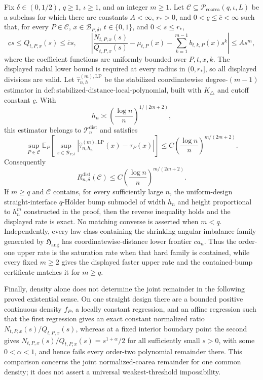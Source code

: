 Fix \(\delta\in(0,1/2)\), \(q\geq1\), \(\iota\geq1\), and an integer \(m\geq1\).  Let \(\mathcal C\subseteq\mathcal P_{\mathrm{coarea}}(q,\iota,L)\) be a subclass for which there are constants \(A<\infty\), \(r_*>0\), and \(0<\underline c\leq\overline c<\infty\) such that, for every \(P\in\mathcal C\), \(x\in\mathcal B_{P,\delta}\), \(t\in\{0,1\}\), and \(0<s\leq r_*\),
\[
 \underline c s\leq Q_{t,P,x}(s)\leq\overline c s,
 \qquad
 \left|\frac{N_{t,P,x}(s)}{Q_{t,P,x}(s)}-\mu_{t,P}(x)-\sum_{k=1}^{m-1}b_{t,k,P}(x)s^k\right|\leq As^m,
\]
where the coefficient functions are uniformly bounded over \(P,t,x,k\).  The displayed radial lower bound is required at every radius in \((0,r_*]\), so all displayed divisions are valid.  Let \(\widehat\tau^{(m),\mathrm{LP}}_{n,h}\) be the stabilized coordinatewise degree-\((m-1)\) estimator in \(\mathrm{def:stabilized\text{-}distance\text{-}local\text{-}polynomial}\), built with \(K_\triangle\) and cutoff constant \(\underline c\).  With
\[
 h_n\asymp\left(\frac{\log n}{n}\right)^{1/(2m+2)},
\]
this estimator belongs to \(\mathcal T_n^{\mathrm{dist}}\) and satisfies
\[
 \sup_{P\in\mathcal C}\mathbb E_P\!\left[
 \sup_{x\in\mathcal B_{P,\delta}}
 \left|\widehat\tau^{(m),\mathrm{LP}}_{n,h_n}(x)-\tau_P(x)\right|
 \right]
 \leq C\left(\frac{\log n}{n}\right)^{m/(2m+2)}.
\]
Consequently
\[
 R_{n,\delta}^{\mathrm{dist}}(\mathcal C)
 \leq C\left(\frac{\log n}{n}\right)^{m/(2m+2)}.
\]
If \(m\geq q\) and \(\mathcal C\) contains, for every sufficiently large \(n\), the uniform-design straight-interface \(q\)-H\"older bump submodel of width \(h_n\) and height proportional to \(h_n^m\) constructed in the proof, then the reverse inequality holds and the displayed rate is exact.  No matching converse is asserted when \(m<q\).  Independently, every law class containing the shrinking angular-imbalance family generated by \(\mathfrak H_{\mathrm{ang}}\) has coordinatewise-distance lower frontier \(ca_n\).  Thus the order-one upper rate is the saturation rate when that hard family is contained, while every fixed \(m\geq2\) gives the displayed faster upper rate and the contained-bump certificate matches it for \(m\geq q\).

Finally, density alone does not determine the joint remainder in the following proved existential sense.  On one straight design there are a bounded positive continuous density \(f_P\), a locally constant regression, and an affine regression such that the first regression gives an exact constant normalized ratio \(N_{t,P,x}(s)/Q_{t,P,x}(s)\), whereas at a fixed interior boundary point the second gives \(N_{t,P,x}(s)/Q_{t,P,x}(s)=s^{1+\alpha}/2\) for all sufficiently small \(s>0\), with some \(0<\alpha<1\), and hence fails every order-two polynomial remainder there.  This comparison concerns the joint normalized-coarea remainder for one common density; it does not assert a universal weakest-threshold impossibility.